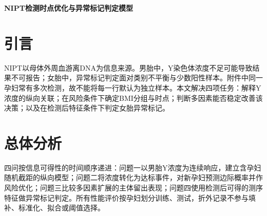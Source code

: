 \documentclass[withoutpreface,bwprint]{format}
\renewcommand{\textbf}[1]{{\song\bfseries #1}}
\begin{document}
{\centering{}\bfseries NIPT检测时点优化与异常标记判定模型\par}
\begin{abstract}
无创产前基因检测（NIPT）需要同时处理重复检测、达标概率、检测时点和异常标记判定。本文以附件中的男胎、女胎记录为对象，以孕妇代码为分组单位，建立可复现的主体层级建模框架。

\textbf{对于问题一，}在Y染色体浓度的logit尺度上建立随机截距线性混合模型，并以加性样条作非线性对照。孕周系数为0.04701，BMI系数为$-0.02446$，组内相关系数为0.7283；按孕妇留出的预测$R^2=-0.0302$，故将结果解释为群体关联而非个体预测承诺。

\textbf{对于问题二，}以Y浓度是否达到4\%建立边际二项概率模型，并将失败风险和延迟代价结合为条件风险。动态规划在连续BMI上联合确定分组和检测时点。中延迟M情景给出11周、11周6天、12周6天的三组方案，对应样本人数为200、25、42。

\textbf{对于问题三，}加入年龄、身高及孕产代理变量后，基础扩展模型Brier为0.11192，较Q2高0.00032，未显示稳定增益；因此保留问题二的简洁主线，并将多因素方案作为条件扩展。

\textbf{对于问题四，}对T13、T18、T21及任一异常标记分别拟合主体隔离的L2正则化Logistic模型。总体异常标记的AP为0.3823、Brier为0.08419。除MCC阈值外，设置训练层90\%灵敏度约束的漏诊优先方案；其外层总体灵敏度为0.8955、特异度为0.4033，展示漏诊与误报的权衡。

本文形成“重复测量解释—概率预测—风险决策—异常判定”的框架。结论仅适用于本附件、所列阈值与风险权重，不能替代临床确诊或独立队列验证。
\end{abstract}

\section{引言}
NIPT以母体外周血游离DNA为信息来源。男胎中，Y染色体浓度不足可能导致结果不可报告；女胎中，异常标记判定面对类别不平衡与少数阳性样本。附件中同一孕妇常有多次检测，故不能将每一行默认为独立样本。本文解决四项任务：解释Y浓度的纵向关联；在风险条件下确定BMI分组与时点；判断多因素能否稳定改善该决策；以及在检测后特征条件下判定女胎异常标记。

\section{总体分析}
四问按信息可得性的时间顺序递进：问题一以男胎Y浓度为连续响应，建立含孕妇随机截距的纵向模型；问题二将浓度转化为达标事件，对新孕妇预测边际概率并作风险优化；问题三比较多因素扩展的主体留出表现；问题四使用检测后可得的测序特征做异常标记判定。所有性能评价按孕妇划分训练、测试，折外记录不参与填补、标准化、拟合或阈值选择。
\end{document}
